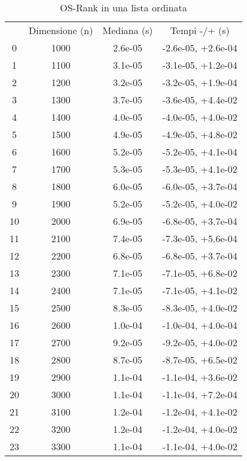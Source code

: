 \begin{table}
\centering
\caption{OS-Rank in una lista ordinata}
\label{OS-Rank in una lista ordinata}
\begin{adjustbox}{width=1\textwidth/2}
\begin{tabular}{|c|c|c|c|}
\hline
 & Dimensione (n) & Mediana (s) & Tempi -/+ (s) \\
0 & 1000 & 2.6e-05 & -2.6e-05, +2.6e-04 \\
\cline{1-4}
1 & 1100 & 3.1e-05 & -3.1e-05, +1.2e-04 \\
\cline{1-4}
2 & 1200 & 3.2e-05 & -3.2e-05, +1.9e-04 \\
\cline{1-4}
3 & 1300 & 3.7e-05 & -3.6e-05, +4.4e-02 \\
\cline{1-4}
4 & 1400 & 4.0e-05 & -4.0e-05, +4.0e-02 \\
\cline{1-4}
5 & 1500 & 4.9e-05 & -4.9e-05, +4.8e-02 \\
\cline{1-4}
6 & 1600 & 5.2e-05 & -5.2e-05, +4.1e-04 \\
\cline{1-4}
7 & 1700 & 5.3e-05 & -5.3e-05, +4.1e-02 \\
\cline{1-4}
8 & 1800 & 6.0e-05 & -6.0e-05, +3.7e-04 \\
\cline{1-4}
9 & 1900 & 5.2e-05 & -5.2e-05, +4.0e-02 \\
\cline{1-4}
10 & 2000 & 6.9e-05 & -6.8e-05, +3.7e-04 \\
\cline{1-4}
11 & 2100 & 7.4e-05 & -7.3e-05, +5.6e-04 \\
\cline{1-4}
12 & 2200 & 6.8e-05 & -6.8e-05, +3.7e-04 \\
\cline{1-4}
13 & 2300 & 7.1e-05 & -7.1e-05, +6.8e-02 \\
\cline{1-4}
14 & 2400 & 7.1e-05 & -7.1e-05, +4.1e-02 \\
\cline{1-4}
15 & 2500 & 8.3e-05 & -8.3e-05, +4.0e-02 \\
\cline{1-4}
16 & 2600 & 1.0e-04 & -1.0e-04, +4.0e-04 \\
\cline{1-4}
17 & 2700 & 9.2e-05 & -9.2e-05, +4.0e-02 \\
\cline{1-4}
18 & 2800 & 8.7e-05 & -8.7e-05, +6.5e-02 \\
\cline{1-4}
19 & 2900 & 1.1e-04 & -1.1e-04, +3.6e-02 \\
\cline{1-4}
20 & 3000 & 1.1e-04 & -1.1e-04, +7.2e-04 \\
\cline{1-4}
21 & 3100 & 1.2e-04 & -1.2e-04, +4.1e-02 \\
\cline{1-4}
22 & 3200 & 1.2e-04 & -1.2e-04, +4.0e-02 \\
\cline{1-4}
23 & 3300 & 1.1e-04 & -1.1e-04, +4.0e-02 \\

\end{tabular}
\end{adjustbox}
\end{table}

